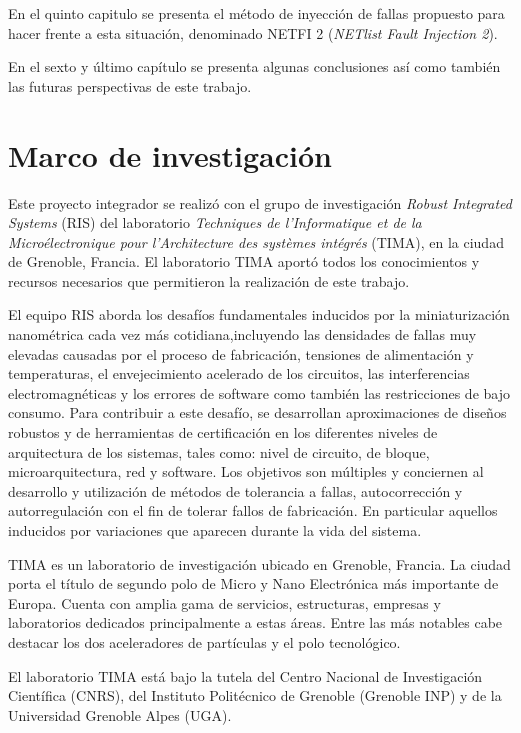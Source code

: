 \documentclass[a4paper,openright,12pt]{report}
\begin{document}
En el quinto capitulo se presenta el método de inyección de fallas propuesto para hacer frente a esta situación, denominado  NETFI  2 (\textit{NETlist Fault Injection 2}). 

En el sexto y último capítulo se presenta algunas conclusiones así como también las futuras perspectivas de este trabajo.



\section{Marco de investigación}



Este proyecto integrador se realizó con el grupo de investigación  \textit{Robust Integrated Systems} (RIS) del laboratorio  \textit{Techniques de l'Informatique et de la Microélectronique pour l'Architecture des systèmes intégrés} (TIMA), en la ciudad de Grenoble, Francia. El laboratorio TIMA aportó todos los conocimientos y recursos necesarios que permitieron la realización de este trabajo.


El equipo RIS aborda los desafíos fundamentales inducidos por la miniaturización nanométrica cada vez más cotidiana,incluyendo las densidades de fallas muy elevadas causadas por el proceso de fabricación, tensiones de alimentación y temperaturas, el envejecimiento acelerado de los circuitos, las interferencias electromagnéticas y los errores de software como también las restricciones de bajo consumo.
Para contribuir a este desafío, se desarrollan aproximaciones de diseños robustos y de herramientas de certificación en los diferentes niveles de arquitectura de los sistemas, tales como: nivel de circuito, de bloque, microarquitectura, red y software. Los objetivos son múltiples y conciernen al desarrollo y  utilización de  métodos de tolerancia a fallas, autocorrección y autorregulación con el fin de tolerar  fallos de fabricación. En particular aquellos inducidos por variaciones que aparecen durante la vida del sistema.

TIMA es un laboratorio de investigación ubicado en  Grenoble, Francia. La ciudad porta el título de  segundo polo de Micro y Nano Electrónica más importante de Europa. Cuenta con amplia gama de servicios, estructuras, empresas y laboratorios dedicados principalmente a estas áreas. Entre las más notables cabe destacar los dos aceleradores de partículas y el polo tecnológico.

El laboratorio TIMA  está bajo la tutela del Centro Nacional de Investigación Científica (CNRS), del Instituto Politécnico de Grenoble (Grenoble INP) y de la Universidad Grenoble Alpes (UGA). 
\end{document}
